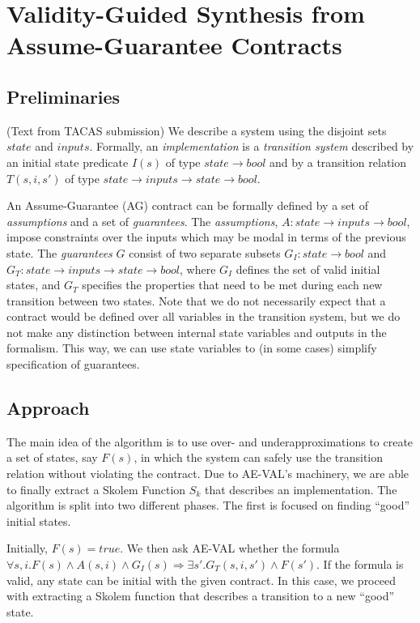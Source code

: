 \documentclass{article}
\begin{document}
\section{Validity-Guided Synthesis from Assume-Guarantee Contracts}

\subsection{Preliminaries}
(Text from TACAS submission)
We describe a system using the disjoint sets $state$ and $inputs$.
Formally, an \emph{implementation} is a \emph{transition system}
described by an initial state predicate $I(s)$ of type $state \to
bool$ and by a transition relation $T(s,i,s')$ of type $state \to
inputs \to state \to bool$.

An Assume-Guarantee (AG) contract can be formally defined by a set of
\emph{assumptions} and a set of \emph{guarantees}. The
\emph{assumptions}, $A: state \rightarrow inputs \rightarrow bool$,
impose constraints over the inputs which may be modal in terms of the
previous state. The \emph{guarantees} $G$ consist of two separate
subsets $G_I: state \rightarrow bool$ and $G_T: state \rightarrow
inputs \rightarrow state \rightarrow bool$, where $G_I$ defines the
set of valid initial states, and $G_T$ specifies the properties that
need to be met during each new transition between two states. Note
that we do not necessarily expect that a contract would be defined
over all variables in the transition system, but we do not make any
distinction between internal state variables and outputs in the
formalism. This way, we can use state variables to (in some cases)
simplify specification of guarantees.

\subsection{Approach}

The main idea of the algorithm is to use over- and underapproximations to
create a set of states, say $F(s)$, in which the system can safely use the
transition relation without violating the contract. Due to AE-VAL's machinery,
we are able to finally extract a Skolem Function $S_k$ that describes an
implementation. The algorithm is split into two different phases. The first is
focused on finding ``good'' initial states.

Initially, $F(s) = true$. We then ask AE-VAL whether the formula $\forall s,i.
F(s) \land A(s,i) \land G_{I}(s) \Rightarrow \exists s'. G_{T}(s,i,s') \land
F(s')$.
If the formula is valid, any state can be initial with the given contract. In
this case, we proceed with extracting a Skolem function that describes a
transition to a new ``good'' state.
\end{document}
